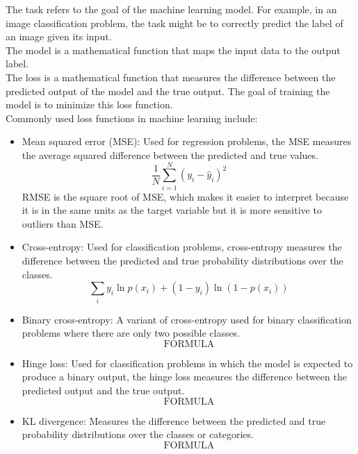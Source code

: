 \documentclass{article}
\begin{document}
\noindent The task refers to the goal of the machine learning model. For example, in an image classification problem, the task might be to correctly predict the label of an image given its input.\\
The model is a mathematical function that maps the input data to the output label.\\
The loss is a mathematical function that measures the difference between the predicted output of the model and the true output. The goal of training the model is to minimize this loss function.\\
Commonly used loss functions in machine learning include:
\begin{itemize}
    \item Mean squared error (MSE): Used for regression problems, the MSE measures the average squared difference between the predicted and true values.
    \[\frac{1}{N} \sum_{i=1}^N (y_i-\hat{y}_i)^2\]
    RMSE is the square root of MSE, which makes it easier to interpret because it is in the same units as the target variable but it is more sensitive to outliers than MSE. 
    \item Cross-entropy: Used for classification problems, cross-entropy measures the difference between the predicted and true probability distributions over the classes.
    \[\sum_i y_i \ln{p(x_i)} + (1-y_i) \ln{(1-p(x_i))}\]
    \item Binary cross-entropy: A variant of cross-entropy used for binary classification problems where there are only two possible classes.
    \[\text{FORMULA}\]
    \item Hinge loss: Used for classification problems in which the model is expected to produce a binary output, the hinge loss measures the difference between the predicted output and the true output.
    \[\text{FORMULA}\]
    \item KL divergence: Measures the difference between the predicted and true probability distributions over the classes or categories.
    \[\text{FORMULA}\]
\end{itemize}
\end{document}
